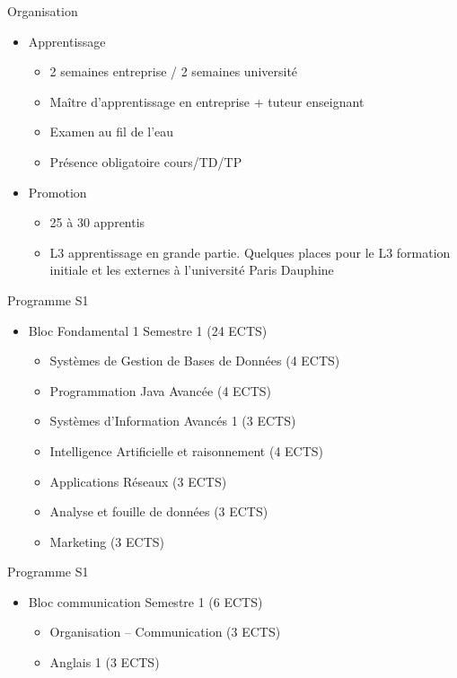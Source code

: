 \documentclass[minimal,compress]{beamer}
\begin{document}
\begin{frame}{Organisation}
\begin{itemize}
\item Apprentissage
\begin{itemize}
\item 2 semaines entreprise / 2 semaines université
\item 	Maître d’apprentissage en entreprise + tuteur enseignant
\item 	Examen au fil de l’eau
\item 	Présence obligatoire cours/TD/TP

\end{itemize}
\item Promotion
\begin{itemize}
\item 25 à 30 apprentis
\item L3 apprentissage  en grande partie. Quelques places pour le L3 formation initiale et les externes à l’université Paris Dauphine
\end{itemize}
\end{itemize}
\end{frame}



\begin{frame}{Programme S1}
\begin{itemize}
\item \alert{Bloc Fondamental 1} Semestre 1 (24 ECTS)
\begin{itemize}
\item Systèmes de Gestion de Bases de Données  (4 ECTS)
\item Programmation  Java Avancée (4 ECTS)
\item Systèmes d’Information Avancés 1 (3 ECTS)
\item Intelligence Artificielle et raisonnement (4 ECTS)


\item Applications Réseaux (3 ECTS)
\item Analyse et fouille de données (3 ECTS)
\item Marketing (3 ECTS)	
\end{itemize}
\end{itemize}
\end{frame}

\begin{frame}{Programme S1}
\begin{itemize}
\item \alert{Bloc communication} Semestre 1 (6 ECTS)
\begin{itemize}
\item Organisation – Communication (3 ECTS)
\item Anglais 1 (3 ECTS)

\end{itemize}
\end{itemize}
\end{frame}
\end{document}
